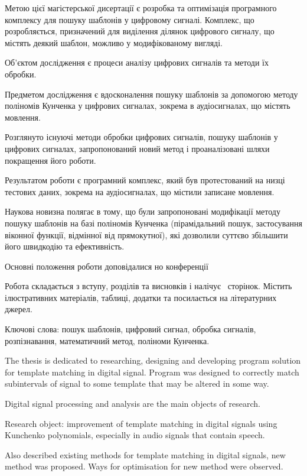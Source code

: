 Метою цієї магістерської дисертації є розробка та оптимізація програмного комплексу для пошуку шаблонів у цифровому
сигналі.
Комплекс, що розробляється, призначений для виділення ділянок цифрового сигналу, що містять деякий шаблон, можливо у
модифікованому вигляді.

Об’єктом дослідження є процеси аналізу цифрових сигналів та методи їх обробки.

Предметом дослідження є вдосконалення пошуку шаблонів за допомогою методу поліномів Кунченка у цифрових сигналах,
зокрема в аудіосигналах, що містять мовлення.

Розглянуто існуючі методи обробки цифрових сигналів, пошуку шаблонів у цифрових сигналах, запропонований новий метод і
проаналізовані шляхи покращення його роботи.

Результатом роботи є програмний комплекс, який був протестований на низці тестових даних, зокрема на аудіосигналах, що
містили записане мовлення.

Наукова новизна полягає в тому, що були запропоновані модифікації методу пошуку шаблонів на базі поліномів Кунченка
(пірамідальний пошук, застосування віконної функції, відмінної від прямокутної), які дозволили суттєво збільшити його
швидкодію та ефективність.

Основні положення роботи доповідалися но конференції 

Робота складається з вступу,   розділів та висновків і налічує ~сторінок.
Містить  ілюстративних матеріалів,  таблиці,  додатки та
посилається на  літературних джерел.

Ключові слова: пошук шаблонів, цифровий сигнал, обробка сигналів, розпізнавання, математичний метод, поліноми
Кунченка.
\clearpage

The thesis is dedicated to researching, designing and developing program solution for template matching in digital signal.
Program was designed to correctly match subintervals of signal to some template that may be altered in some way.

Digital signal processing and analysis are the main objects of research.

Research object: improvement of template matching in digital signals using Kunchenko polynomials, especially in
audio signals that contain speech.

Also described existing methods for template matching in digital signals, new method was proposed.
Ways for optimisation for new method were observed.


